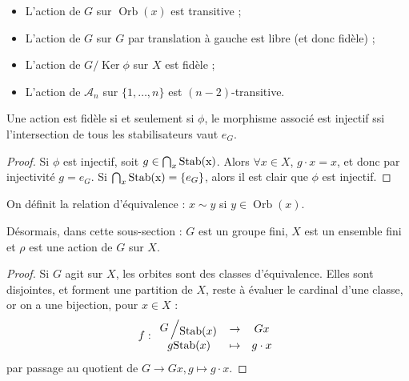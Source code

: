 \exemple
{
\begin{itemize}
    \item L'action de $G$ sur $\operatorname{Orb}(x)$ est transitive ;
    \item L'action de $G$ sur $G$ par translation à gauche est libre (et donc fidèle) ;
    \item L'action de $G / \operatorname{Ker} \phi$ sur $X$ est fidèle ;
    \item L'action de $\mathcal{A}_n$ sur $\{1, \ldots, n\}$ est $(n-2)$-transitive.
\end{itemize}
}

\Prop
{
	Une action est fidèle si et seulement si $\phi$, le morphisme associé est injectif ssi l'intersection de tous les stabilisateurs vaut $e_G$.
}


\begin{proof}
	Si $\phi$ est injectif, soit $g\in  \bigcap_x \textup{Stab(x)}$. Alors $\forall x \in X$, $g\cdot x = x$, et donc par injectivité $g = e_G$. Si $\bigcap_x \textup{Stab(x)} = \{e_G\}$, alors il est clair que $\phi$ est injectif.
\end{proof}

\DefProp
{
	On définit la relation d'équivalence : $x \sim y$ si $y \in \operatorname{Orb}(x)$.
}

\Not
{
	Désormais, dans cette sous-section : $G$ est un groupe fini, $X$ est un ensemble fini et $\rho$ est une action de $G$ sur $X$.
}


\begin{proof}
	Si $G$ agit sur $X$, les orbites sont des classes d'équivalence. Elles sont disjointes, et forment une partition de $X$, reste à évaluer le cardinal d'une classe, or on a une bijection, pour $x \in X$ :
	\[
		f : \begin{array}{cccc} \bigslant{G}{\textup{Stab}(x)} & \to & G x\\ g \textup{Stab}(x) & \mapsto & g\cdot x\end{array}
	\]
	par passage au quotient de $G \to Gx,g \mapsto g \cdot x$.
\end{proof}



